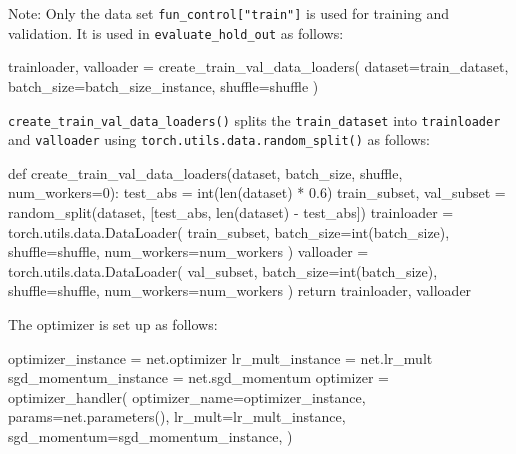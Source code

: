 \documentclass[
  letterpaper,
  DIV=11,
  numbers=noendperiod]{scrreprt}
\newenvironment{Shaded}{\begin{snugshade}}{\end{snugshade}}
\newcommand{\NormalTok}[1]{\textcolor[rgb]{0.00,0.23,0.31}{#1}}
\begin{document}
Note: Only the data set \texttt{fun\_control{[}"train"{]}} is used for
training and validation. It is used in \texttt{evaluate\_hold\_out} as
follows:

\begin{Shaded}
\begin{Highlighting}[]
\NormalTok{trainloader, valloader = create\_train\_val\_data\_loaders(}
\NormalTok{                dataset=train\_dataset, batch\_size=batch\_size\_instance, shuffle=shuffle}
\NormalTok{            )}
\end{Highlighting}
\end{Shaded}

\texttt{create\_train\_val\_data\_loaders()} splits the
\texttt{train\_dataset} into \texttt{trainloader} and \texttt{valloader}
using \texttt{torch.utils.data.random\_split()} as follows:

\begin{Shaded}
\begin{Highlighting}[]
\NormalTok{def create\_train\_val\_data\_loaders(dataset, batch\_size, shuffle, num\_workers=0):}
\NormalTok{    test\_abs = int(len(dataset) * 0.6)}
\NormalTok{    train\_subset, val\_subset = random\_split(dataset, [test\_abs, len(dataset) {-} test\_abs])}
\NormalTok{    trainloader = torch.utils.data.DataLoader(}
\NormalTok{        train\_subset, batch\_size=int(batch\_size), shuffle=shuffle, num\_workers=num\_workers}
\NormalTok{    )}
\NormalTok{    valloader = torch.utils.data.DataLoader(}
\NormalTok{        val\_subset, batch\_size=int(batch\_size), shuffle=shuffle, num\_workers=num\_workers}
\NormalTok{    )}
\NormalTok{    return trainloader, valloader}
\end{Highlighting}
\end{Shaded}

The optimizer is set up as follows:

\begin{Shaded}
\begin{Highlighting}[]
\NormalTok{optimizer\_instance = net.optimizer}
\NormalTok{lr\_mult\_instance = net.lr\_mult}
\NormalTok{sgd\_momentum\_instance = net.sgd\_momentum}
\NormalTok{optimizer = optimizer\_handler(}
\NormalTok{    optimizer\_name=optimizer\_instance,}
\NormalTok{    params=net.parameters(),}
\NormalTok{    lr\_mult=lr\_mult\_instance,}
\NormalTok{    sgd\_momentum=sgd\_momentum\_instance,}
\NormalTok{)}
\end{Highlighting}
\end{Shaded}
\end{document}
